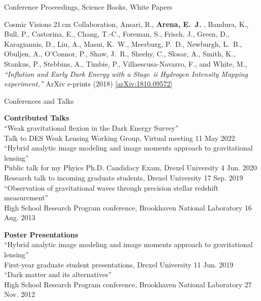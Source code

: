 \documentclass{resume} %
\newcommand{\forceindent}{\leavevmode{\parindent=1em\indent}}
\begin{document}
\begin{rSection}{Conference Proceedings, Science Books, White Papers}
\begin{etaremune}
\item {Cosmic Visions 21$\,$cm Collaboration}, {Ansari}, R., \textbf{{Arena}, E.~J.} , 
	{Bandura}, K., {Bull}, P., {Castorina}, E., {Chang}, T.-C., 
	{Foreman}, S., {Frisch}, J., {Green}, D., {Karagiannis}, D., 
	{Liu}, A., {Masui}, K.~W., {Meerburg}, P.~D., {Newburgh}, L.~B., 
	{Obuljen}, A., {O'Connor}, P., {Shaw}, J.~R., {Sheehy}, C., 
	{Slosar}, A., {Smith}, K., {Stankus}, P., {Stebbins}, A., 
	{Timbie}, P., {Villaescusa-Navarro}, F., and {White}, M., 
\textit{``Inflation and Early Dark Energy with a {Stage~{\sc ii}} Hydrogen Intensity Mapping experiment,''} ArXiv e-prints (2018) \href{https://arxiv.org/abs/1810.09572}{[arXiv:1810.09572]}

\end{etaremune}

\end{rSection}

\newpage %

\begin{rSection}{Conferences and Talks}

\textbf{Contributed Talks}\\
``Weak gravitational flexion in the Dark Energy Survey''\\
\forceindent Talk to DES Weak Lensing Working Group, Virtual meeting \hfill 11 May 2022\\
``Hybrid analytic image modeling and image moments approach to gravitational lensing''\\
\forceindent Public talk for my Phyics Ph.D. Candidacy Exam, Drexel University \hfill 4 Jun. 2020\\
\forceindent Research talk to incoming graduate students, Drexel University \hfill 17 Sep. 2019\\
``Observation of gravitational waves through precision stellar redshift measurement''\\
\forceindent High School Research Program conference, Brookhaven National Laboratory \hfill 16 Aug. 2013

\textbf{Poster Presentations}\\
``Hybrid analytic image modeling and image moments approach to gravitational lensing''\\
\forceindent First-year graduate student presentations, Drexel University \hfill 11 Jun. 2019\\
``Dark matter and its alternatives''\\
\forceindent High School Research Program conference, Brookhaven National Laboratory \hfill 27 Nov. 2012

\end{rSection}
\end{document}
